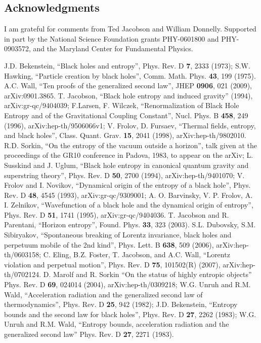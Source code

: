 \documentclass[12pt]{article}
\begin{document}
\small
\subsection*{Acknowledgments}
I am grateful for comments from Ted Jacobson and William Donnelly.  Supported in part by the National Science Foundation grants PHY-0601800 and PHY-0903572, and the Maryland Center for Fundamental Physics.
\normalsize

\begin{thebibliography}{99}
J.D. Bekenstein, ``Black holes and entropy'', Phys. Rev. D \textbf{7}, 2333 (1973); S.W. Hawking, ``Particle creation by black holes'', Comm. Math. Phys. \textbf{43}, 199 (1975).
A.C. Wall, ``Ten proofs of the generalized second law'', JHEP \textbf{0906}, 021 (2009), arXiv:0901.3865.
T. Jacobson, ``Black hole entropy and induced gravity'' (1994), arXiv:gr-qc/9404039; 
F.Larsen, F. Wilczek, ``Renormalization of Black Hole Entropy and of the Gravitational Coupling Constant'', Nucl. Phys. B \textbf{458}, 249 (1996), arXiv:hep-th/9506066v1; V. Frolov, D. Fursaev, ``Thermal fields, entropy, and black holes'', Class. Quant. Grav. \textbf{15}, 2041 (1998), arXiv:hep-th/9802010.
R.D. Sorkin, ``On the entropy of the vacuum outside a horizon'', talk given at the proceedings of the GR10 conference in Padova, 1983, to appear on the arXiv; L. Susskind and J. Uglum, ``Black hole entropy in canonical quantum gravity and superstring theory'', Phys. Rev. D \textbf{50}, 2700 (1994), arXiv:hep-th/9401070; V. Frolov and I. Novikov, ``Dynamical origin of the entropy of a black hole'', Phys. Rev. D \textbf{48}, 4545 (1993), arXiv:gr-qc/9309001; A. O. Barvinsky, V. P. Frolov, A. I. Zelnikov, ``Wavefunction of a black hole and the dynamical origin of entropy'', Phys. Rev. D \textbf{51}, 1741 (1995), arXiv:gr-qc/9404036.
T. Jacobson and R. Parentani, ``Horizon entropy'', Found. Phys. \textbf{33}, 323 (2003).
S.L. Dubovsky, S.M. Sibiryakov, ``Spontaneous breaking of Lorentz invariance, black holes and perpetuum mobile of the 2nd kind'', Phys. Lett. B \textbf{638}, 509 (2006), arXiv:hep-th/0603158; C. Eling, B.Z. Foster, T. Jacobson, and A.C. Wall, ``Lorentz violation and perpetual motion'', Phys. Rev. D \textbf{75}, 101502(R) (2007), arXiv:hep-th/0702124.
D. Marolf and R. Sorkin ``On the status of highly entropic objects'' Phys. Rev. D \textbf{69}, 024014 (2004), arXiv:hep-th/0309218; W.G. Unruh and R.M. Wald, ``Acceleration radiation and the generalized second law of thermodynamics'', Phys. Rev. D \textbf{25}, 942 (1982); J.D. Bekenstein, ``Entropy bounds and the second law for black holes'', Phys. Rev. D \textbf{27}, 2262 (1983); W.G. Unruh and R.M. Wald, ``Entropy bounds, acceleration radiation and the generalized second law'' Phys. Rev. D \textbf{27}, 2271 (1983).

\end{thebibliography}
\end{document}
